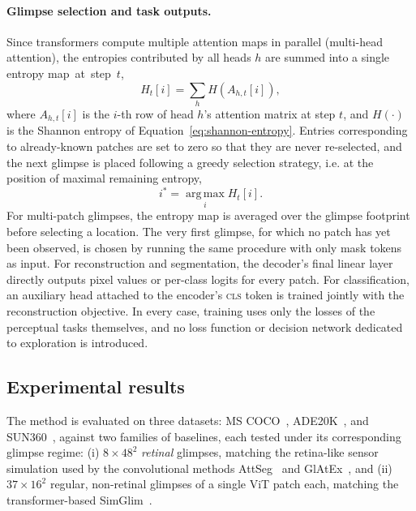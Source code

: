 \paragraph{Glimpse selection and task outputs.} Since transformers compute multiple attention maps in parallel (multi-head attention), the entropies contributed by all heads $h$ are summed into a single entropy map~at~step~$t$,
\begin{equation}
    H_t[i] = \sum_h H\!\left(A_{h,t}[i]\right),
    \label{eq:ame-entropy-map}
\end{equation}
where $A_{h,t}[i]$ is the $i$-th row of head $h$'s attention matrix at step $t$, and $H(\cdot)$ is the Shannon entropy of Equation~\ref{eq:shannon-entropy}. Entries corresponding to already-known patches are set to zero so that they are never re-selected, and the next glimpse is placed following a greedy selection strategy, i.e. at the position of maximal remaining entropy,
\begin{equation}
    i^* = \operatorname*{arg\,max}_i H_t[i].
    \label{eq:ame-argmax}
\end{equation}
For multi-patch glimpses, the entropy map is averaged over the glimpse footprint before selecting a location. The very first glimpse, for which no patch has yet been observed, is chosen by running the same procedure with only mask tokens as input. For reconstruction and segmentation, the decoder's final linear layer directly outputs pixel values or per-class logits for every patch. For classification, an auxiliary head attached to the encoder's \textsc{cls} token is trained jointly with the reconstruction objective. In every case, training uses only the losses of the perceptual tasks themselves, and no loss function or decision network dedicated to exploration is introduced.

\subsection{Experimental results}

The method is evaluated on three datasets: MS COCO~\cite{lin2014microsoft}, ADE20K~\cite{zhou2017scene}, and SUN360~\cite{xiao2012recognizing}, against two families of baselines, each tested under its corresponding glimpse regime: (i) $8 \times 48^2$ \emph{retinal} glimpses, matching the retina-like sensor simulation used by the convolutional methods AttSeg~\cite{seifi2020segment} and GlAtEx~\cite{seifi2021glimpse}, and (ii) $37\times16^2$ regular, non-retinal glimpses of a single ViT patch each, matching the transformer-based SimGlim~\cite{Jha2023WACV}.

